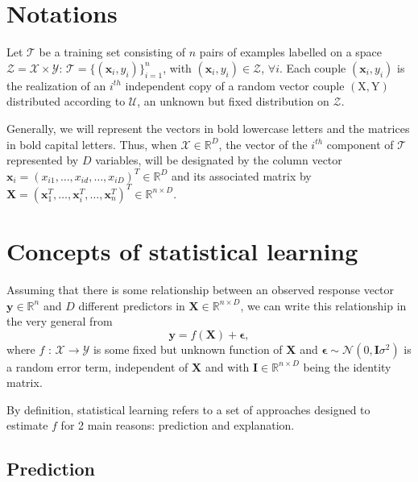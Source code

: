 \documentclass[]{book}
\begin{document}
\hypertarget{notations}{%
\section{Notations}\label{notations}}

Let \(\mathcal{T}\) be a training set consisting of \(n\) pairs of examples
labelled on a space \(\mathcal{Z} = \mathcal{X} \times \mathcal{Y}\):
\(\mathcal{T} = \{(\boldsymbol{x}_{i}, y_{i})\}_{i=1}^{n}\), with
\((\boldsymbol{x}_{i}, y_{i}) \in \mathcal{Z}\), \(\forall i\). Each couple
\((\boldsymbol{x}_{i}, y_{i})\) is the realization of an \(i^{th}\) independent copy
of a random vector couple \((\mathrm{X}, \mathrm{Y})\) distributed according to
\(\mathcal{U}\), an unknown but fixed distribution on \(\mathcal{Z}\).

Generally, we will represent the vectors in bold lowercase letters and
the matrices in bold capital letters. Thus, when \(\mathcal{X} \in \mathbb{R}^D\),
the vector of the \(i^{th}\) component of \(\mathcal{T}\) represented by \(D\)
variables, will be designated by the column vector
\(\boldsymbol{x}_i = (x_{i1}, \dots, x_{id}, \dots, x_{iD})^T \in \mathbb{R}^D\) and its
associated matrix by
\(\mathbf{X} = (\boldsymbol{x}_1^T, \dots, \boldsymbol{x}_i^T, \dots, \boldsymbol{x}_n^T)^T \in \mathbb{R}^{n \times D}\).

\hypertarget{concepts-of-statistical-learning}{%
\section{Concepts of statistical learning}\label{concepts-of-statistical-learning}}

Assuming that there is some relationship between an observed response
vector \(\mathbf{y} \in \mathbb{R}^n\) and \(D\) different predictors in
\(\mathbf{X} \in \mathbb{R}^{n \times D}\), we can write this relationship in the very
general from \[\mathbf{y} = f(\mathbf{X}) + \boldsymbol{\epsilon} ,\] where \(f\) :
\(\mathcal{X} \rightarrow \mathcal{Y}\) is some fixed but unknown function of
\(\mathbf{X}\) and \(\boldsymbol{\epsilon} \sim \mathcal{N}(0, \mathbf{I}\sigma^2)\) is a random error
term, independent of \(\mathbf{X}\) and with \(\mathbf{I} \in \mathbb{R}^{n \times D}\) being the
identity matrix.

By definition, statistical learning refers to a set of approaches
designed to estimate \(f\) for 2 main reasons: prediction and explanation.

\hypertarget{prediction}{%
\subsection{Prediction}\label{prediction}}
\end{document}
